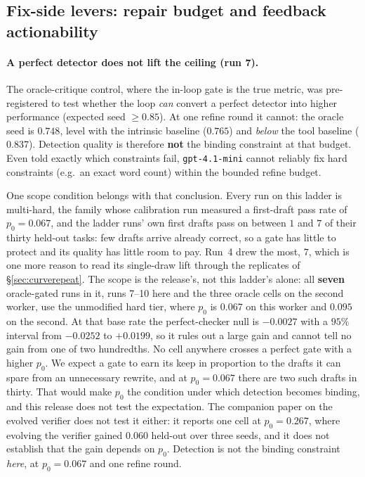 \documentclass[11pt]{article}
\begin{document}
\subsection{Fix-side levers: repair budget and feedback actionability}
\label{sec:fixside}

\paragraph{A perfect detector does not lift the ceiling (run 7).} The oracle-critique
control, where the in-loop gate is the true metric, was pre-registered to test
whether the loop \emph{can} convert a perfect detector into higher performance
(expected seed $\ge 0.85$). At one refine round it cannot: the oracle seed is $0.748$, level with
the intrinsic baseline ($0.765$) and \emph{below} the tool baseline ($0.837$). Detection
quality is therefore \textbf{not} the binding constraint at that budget. Even told exactly which
constraints fail, \texttt{gpt-4.1-mini} cannot reliably fix hard constraints (e.g.\ an exact
word count) within the bounded refine budget.

One scope condition belongs with that conclusion. Every run on this ladder is multi-hard, the
family whose calibration run measured a first-draft pass rate of $p_0 = 0.067$, and the ladder
runs' own first drafts pass on between $1$ and $7$ of their thirty held-out tasks: few drafts
arrive already correct, so a gate has little to protect and its quality has little room to pay.
Run~4 drew the most, $7$, which is one more reason to read its single-draw lift through the
replicates of \S\ref{sec:curverepeat}. The scope is the release's, not this ladder's alone: all
\textbf{seven} oracle-gated runs in it, runs 7--10 here and the three oracle cells on the second
worker, use the unmodified hard tier, where $p_0$ is $0.067$ on this worker and $0.095$ on the
second. At that base rate the perfect-checker null is $-0.0027$ with a $95\%$ interval from
$-0.0252$ to $+0.0199$, so it rules out a large gain and cannot tell no gain from one of two
hundredths. No cell anywhere crosses a perfect gate with a higher $p_0$. We expect a gate to earn
its keep in proportion to the drafts it can spare from an unnecessary rewrite, and at
$p_0 = 0.067$ there are two such drafts in thirty. That would make $p_0$ the condition under which
detection becomes binding, and this release does not test the expectation. The companion paper
on the evolved verifier does not test it either: it reports one cell at $p_0 = 0.267$, where evolving the verifier gained $0.060$ held-out over three seeds, and
it does not establish that the gain depends on $p_0$. Detection is not the binding constraint
\emph{here}, at $p_0 = 0.067$ and one refine round.
\end{document}
